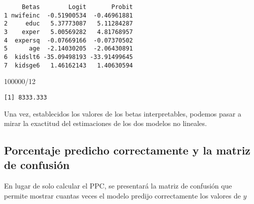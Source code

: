 \documentclass[
  letterpaper,
  DIV=11,
  numbers=noendperiod]{scrreprt}
\newenvironment{Shaded}{\begin{snugshade}}{\end{snugshade}}
\newcommand{\AttributeTok}[1]{\textcolor[rgb]{0.40,0.45,0.13}{#1}}
\newcommand{\CommentTok}[1]{\textcolor[rgb]{0.37,0.37,0.37}{#1}}
\newcommand{\DecValTok}[1]{\textcolor[rgb]{0.68,0.00,0.00}{#1}}
\newcommand{\FloatTok}[1]{\textcolor[rgb]{0.68,0.00,0.00}{#1}}
\newcommand{\FunctionTok}[1]{\textcolor[rgb]{0.28,0.35,0.67}{#1}}
\newcommand{\NormalTok}[1]{\textcolor[rgb]{0.00,0.23,0.31}{#1}}
\newcommand{\OtherTok}[1]{\textcolor[rgb]{0.00,0.23,0.31}{#1}}
\newcommand{\SpecialCharTok}[1]{\textcolor[rgb]{0.37,0.37,0.37}{#1}}
\newcommand{\StringTok}[1]{\textcolor[rgb]{0.13,0.47,0.30}{#1}}
\begin{document}
\begin{verbatim}
     Betas        Logit       Probit
1 nwifeinc  -0.51900534  -0.46961881
2     educ   5.37773087   5.11284287
3    exper   5.00569282   4.81768957
4  expersq  -0.07669166  -0.07370502
5      age  -2.14030205  -2.06430891
6  kidslt6 -35.09498193 -33.91499645
7  kidsge6   1.46162143   1.40630594
\end{verbatim}

\begin{Shaded}
\begin{Highlighting}[]
\DecValTok{100000}\SpecialCharTok{/}\DecValTok{12}
\end{Highlighting}
\end{Shaded}

\begin{verbatim}
[1] 8333.333
\end{verbatim}

Una vez, establecidos los valores de los betas interpretables, podemos
pasar a mirar la exactitud del estimaciones de los dos modelos no
lineales.

\subsection{Porcentaje predicho correctamente y la matriz de
confusión}\label{porcentaje-predicho-correctamente-y-la-matriz-de-confusiuxf3n}

En lugar de solo calcular el PPC, se presentará la matriz de confusión
que permite mostrar cuantas veces el modelo predijo correctamente los
valores de \(y\)

\begin{Shaded}
\end{Shaded}
\end{document}
